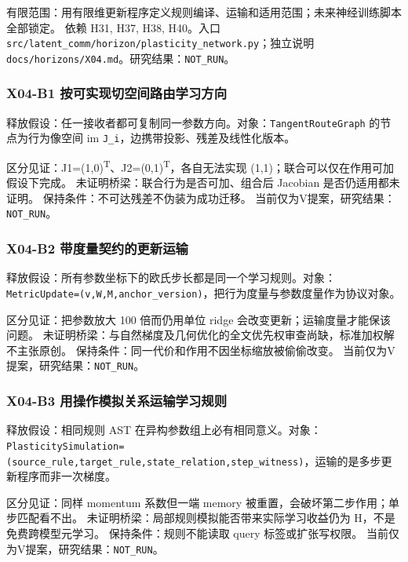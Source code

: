 \documentclass[
  10pt,
]{article}
\begin{document}
有限范围：用有限维更新程序定义规则编译、运输和适用范围；未来神经训练脚本全部锁定。
依赖 H31, H37, H38, H40。入口
{\small\nolinkurl{src/latent_comm/horizon/plasticity_network.py}}；独立说明
{\small\nolinkurl{docs/horizons/X04.md}}。研究结果：\nolinkurl{NOT_RUN}。

\subsubsection{X04-B1
按可实现切空间路由学习方向}\label{x04-b1-ux6309ux53efux5b9eux73b0ux5207ux7a7aux95f4ux8defux7531ux5b66ux4e60ux65b9ux5411}

释放假设：任一接收者都可复制同一参数方向。对象：\nolinkurl{TangentRouteGraph}
的节点为行为像空间 im \nolinkurl{J_i}，边携带投影、残差及线性化版本。

区分见证：J1=(1,0)\textsuperscript{T}、J2=(0,1)\textsuperscript{T}，各自无法实现
(1,1)；联合可以仅在作用可加假设下完成。
未证明桥梁：联合行为是否可加、组合后 Jacobian 是否仍适用都未证明。
保持条件：不可达残差不伪装为成功迁移。
当前仅为V提案，研究结果：\nolinkurl{NOT_RUN}。

\subsubsection{X04-B2
带度量契约的更新运输}\label{x04-b2-ux5e26ux5ea6ux91cfux5951ux7ea6ux7684ux66f4ux65b0ux8fd0ux8f93}

释放假设：所有参数坐标下的欧氏步长都是同一个学习规则。对象：\nolinkurl{MetricUpdate=(v,W,M,anchor_version)}，把行为度量与参数度量作为协议对象。

区分见证：把参数放大 100 倍而仍用单位 ridge
会改变更新；运输度量才能保该问题。
未证明桥梁：与自然梯度及几何优化的全文优先权审查尚缺，标准加权解不主张原创。
保持条件：同一代价和作用不因坐标缩放被偷偷改变。
当前仅为V提案，研究结果：\nolinkurl{NOT_RUN}。

\subsubsection{X04-B3
用操作模拟关系运输学习规则}\label{x04-b3-ux7528ux64cdux4f5cux6a21ux62dfux5173ux7cfbux8fd0ux8f93ux5b66ux4e60ux89c4ux5219}

释放假设：相同规则 AST
在异构参数组上必有相同意义。对象：\nolinkurl{PlasticitySimulation=(source_rule,target_rule,state_relation,step_witness)}，运输的是多步更新程序而非一次梯度。

区分见证：同样 momentum 系数但一端 memory
被重置，会破坏第二步作用；单步匹配看不出。
未证明桥梁：局部规则模拟能否带来实际学习收益仍为
H，不是免费跨模型元学习。 保持条件：规则不能读取 query
标签或扩张写权限。 当前仅为V提案，研究结果：\nolinkurl{NOT_RUN}。
\end{document}
